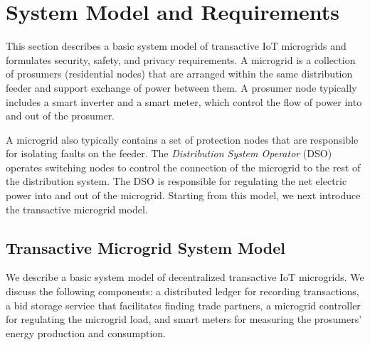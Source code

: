 \section{System Model and Requirements}

This section describes a basic system model of transactive IoT
microgrids and formulates security, safety, and privacy requirements.
A microgrid is a collection of prosumers (residential nodes) that are
arranged within the same distribution feeder and support exchange of
power between them. A prosumer node typically includes a smart
inverter and a smart meter, which control the flow of power into and
out of the prosumer. 

A microgrid also typically contains a set of protection nodes that are
responsible for isolating faults on the feeder.  The
\emph{Distribution System Operator} (DSO) operates %
switching nodes to control the connection of the microgrid to the rest
of the distribution system. The DSO is responsible for regulating the
net electric power into and out of the microgrid. Starting from this
model, we next introduce the transactive microgrid model.

\subsection{Transactive Microgrid System Model}
  We
describe a basic system model of decentralized transactive IoT
microgrids.  We discuss the following components: a distributed ledger
for recording transactions, a bid storage service that facilitates
finding trade partners, a microgrid controller for regulating the
microgrid load, and smart meters for measuring the prosumers' energy
production and consumption.



